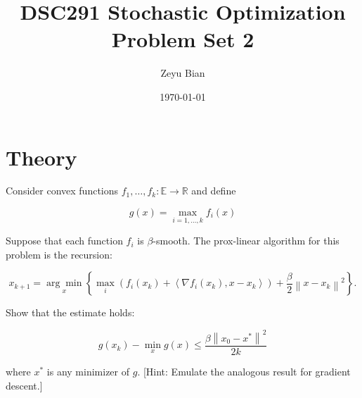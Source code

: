 \documentclass[en,hazy,blue,12pt,normal]{elegantnote}
\title{DSC291 Stochastic Optimization\\Problem Set 2}
\author{Zeyu Bian}
\date{\today}
\begin{document}
\maketitle

\section{Theory}

\begin{homework}
    Consider convex functions $f_1, \ldots, f_k: \mathbb{E} \rightarrow \mathbb{R}$ and define

$$
g(x)=\max _{i=1, \ldots, k} f_i(x)
$$


Suppose that each function $f_i$ is $\beta$-smooth. The prox-linear algorithm for this problem is the recursion:

$$
x_{k+1}=\underset{x}{\arg \min }\left\{\underset{i}{\max}\left(f_i\left(x_k\right)+\left\langle\nabla f_i\left(x_k\right), x-x_k\right\rangle\right)+\frac{\beta}{2}\left\|x-x_k\right\|^2\right\} .
$$


Show that the estimate holds:

$$
g\left(x_k\right)-\min _x g(x) \leq \frac{\beta\left\|x_0-x^*\right\|^2}{2 k}
$$

where $x^*$ is any minimizer of $g$.
[Hint: Emulate the analogous result for gradient descent.]
\end{homework}
\end{document}
